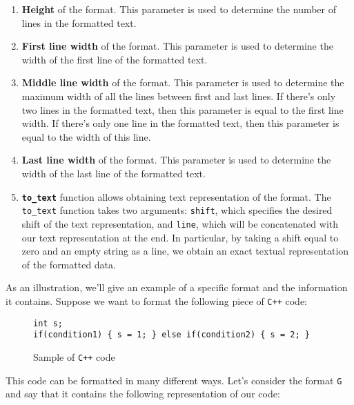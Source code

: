 \documentclass[14pt]{constructor-diploma}
\begin{document}
\begin{enumerate}
  \item \textbf{Height} of the format. This parameter is used to determine the number of lines in the formatted text.
  \item \textbf{First line width} of the format. This parameter is used to determine the width of the first line of the formatted text.
  \item \textbf{Middle line width} of the format. This parameter is used to determine the maximum width of all the lines between first and last lines.
  If there's only two lines in the formatted text, then this parameter is equal to the first line width. 
  If there's only one line in the formatted text, then this parameter is equal to the width of this line.
  \item \textbf{Last line width} of the format. This parameter is used to determine the width of the last line of the formatted text.
  \item \textbf{\texttt{to\_text}} function allows obtaining text representation of the format. 
  The \texttt{to\_text} function takes two arguments: 
  \texttt{shift}, which specifies the desired shift of the text representation, and \texttt{line}, 
  which will be concatenated with our text representation at the end.
  In particular, by taking a shift equal to zero and an empty string as a line, we obtain an exact textual representation of the formatted data.


\end{enumerate}

As an illustration, we'll give an example of a specific format and the information it contains. 
Suppose we want to format the following piece of \texttt{C++} code:

\begin{figure}[H]

\begin{mdframed}[backgroundcolor=bg]
\begin{verbatim}
int s;
if(condition1) { s = 1; } else if(condition2) { s = 2; }
\end{verbatim}
\end{mdframed}
\caption{Sample of \texttt{C++} code}
\end{figure}

This code can be formatted in many different ways. 
Let's consider the format \texttt{G} and say that it contains the following representation of our code:
\end{document}

